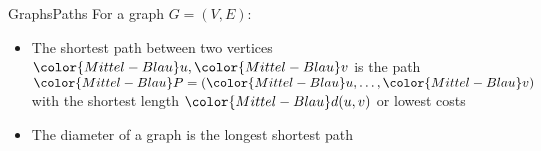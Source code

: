 \begin{frame}{Graphs}{Paths}
  For a graph {\color{Mittel-Blau}$G = (V, E)$}:
  \begin{itemize}
    \item
      The {\color{Mittel-Blau}shortest path} between two vertices
      ${\color{Mittel-Blau}u}, {\color{Mittel-Blau}v}$ is the path
      \begin{math}
      {\color{Mittel-Blau}P}
      = ({\color{Mittel-Blau}u}, \dots, {\color{Mittel-Blau}v})
      \end{math}
      with the shortest length ${\color{Mittel-Blau}d(u,v)}$ or lowest costs
    \item
      The {\color{Mittel-Blau}diameter} of a graph is the {\color{Mittel-Blau}longest shortest path}
  \end{itemize}
\end{frame}
